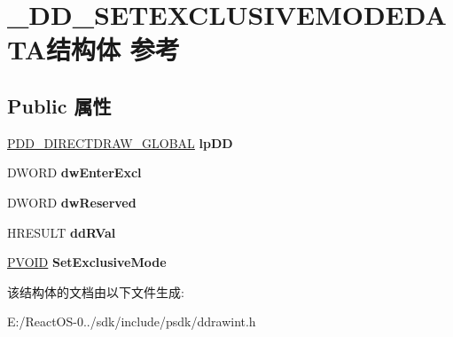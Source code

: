 \hypertarget{struct___d_d___s_e_t_e_x_c_l_u_s_i_v_e_m_o_d_e_d_a_t_a}{}\section{\+\_\+\+D\+D\+\_\+\+S\+E\+T\+E\+X\+C\+L\+U\+S\+I\+V\+E\+M\+O\+D\+E\+D\+A\+T\+A结构体 参考}
\label{struct___d_d___s_e_t_e_x_c_l_u_s_i_v_e_m_o_d_e_d_a_t_a}
\subsection*{Public 属性}
\begin{DoxyCompactItemize}
\item 
\mbox{\label{struct___d_d___s_e_t_e_x_c_l_u_s_i_v_e_m_o_d_e_d_a_t_a_a44e555b46d3c1243f9a0d72ab3a9cbab}} 
\hyperlink{struct___d_d___d_i_r_e_c_t_d_r_a_w___g_l_o_b_a_l}{P\+D\+D\+\_\+\+D\+I\+R\+E\+C\+T\+D\+R\+A\+W\+\_\+\+G\+L\+O\+B\+AL} {\bfseries lp\+DD}
\item 
\mbox{\label{struct___d_d___s_e_t_e_x_c_l_u_s_i_v_e_m_o_d_e_d_a_t_a_a1336237dca71389059d12cc60f1d927c}} 
D\+W\+O\+RD {\bfseries dw\+Enter\+Excl}
\item 
\mbox{\label{struct___d_d___s_e_t_e_x_c_l_u_s_i_v_e_m_o_d_e_d_a_t_a_af31ccc7659d04585927e2294ba7b1838}} 
D\+W\+O\+RD {\bfseries dw\+Reserved}
\item 
\mbox{\label{struct___d_d___s_e_t_e_x_c_l_u_s_i_v_e_m_o_d_e_d_a_t_a_aa137862aa2061688640f50315915a288}} 
H\+R\+E\+S\+U\+LT {\bfseries dd\+R\+Val}
\item 
\mbox{\label{struct___d_d___s_e_t_e_x_c_l_u_s_i_v_e_m_o_d_e_d_a_t_a_a25f235725e9de8be9fb52071f5c6b20f}} 
\hyperlink{interfacevoid}{P\+V\+O\+ID} {\bfseries Set\+Exclusive\+Mode}
\end{DoxyCompactItemize}


该结构体的文档由以下文件生成\+:\begin{DoxyCompactItemize}
\item 
E\+:/\+React\+O\+S-\/0../sdk/include/psdk/ddrawint.\+h\end{DoxyCompactItemize}
